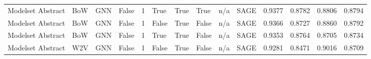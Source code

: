 \begin{table}[t]
\begin{tabular}{llllrlllllrrrr}
Modelset Abstract & BoW & GNN & False & 1 & True & True & True & n/a & SAGE & 0.9377 & 0.8782 & 0.8806 & 0.8794 \\
Modelset Abstract & BoW & GNN & False & 1 & False & True & False & n/a & SAGE & 0.9366 & 0.8727 & 0.8860 & 0.8792 \\
Modelset Abstract & BoW & GNN & False & 1 & True & True & False & n/a & SAGE & 0.9353 & 0.8764 & 0.8705 & 0.8734 \\
Modelset Abstract & W2V & GNN & False & 1 & False & True & False & n/a & SAGE & 0.9281 & 0.8471 & 0.9016 & 0.8709 \\
\bottomrule
\end{tabular}
\end{table}
